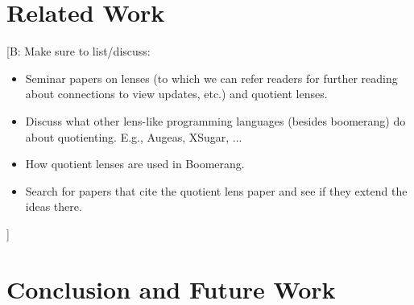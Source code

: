 \documentclass{svproc}
\newcommand{\FINISH}[3]{\ifdraft\textcolor{#1}{[#2: #3]}\fi}
\newcommand{\bcp}[1]{\FINISH{dkred}{B}{#1}}
\begin{document}
\section{Related Work}
\label{relwork}

\bcp{Make sure to list/discuss:
  \begin{itemize}
  \item Seminar papers on lenses (to which we can refer readers for further
    reading about connections to view updates, etc.) and quotient lenses.
  \item Discuss what other lens-like programming languages (besides
    boomerang) do about quotienting.  E.g., Augeas, XSugar, ...
  \item How quotient lenses are used in Boomerang.
  \item Search for papers that cite the quotient lens paper and see if they
    extend the ideas there.
  \end{itemize}
}

\section{Conclusion and Future Work}
\label{concl}
\end{document}
